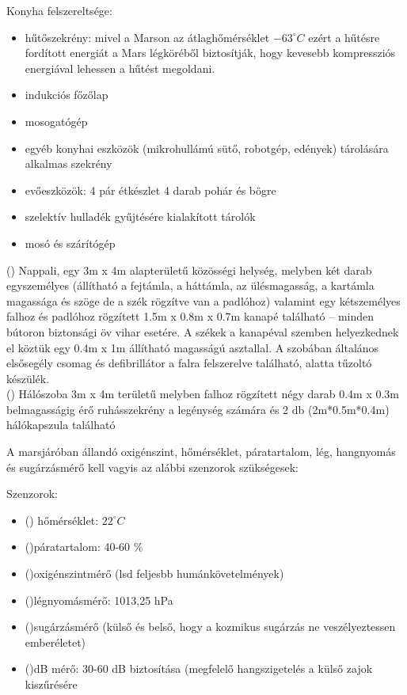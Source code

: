 \documentclass[12pt]{report}
\begin{document}
Konyha felszereltsége:
\begin{itemize}
    \item hűtőszekrény: mivel a Marson az átlaghőmérséklet $ -63^\circ C $ ezért a hűtésre fordított energiát a Mars légköréből biztosítják, hogy kevesebb kompressziós energiával lehessen a hűtést megoldani.
    \item indukciós főzőlap
    \item mosogatógép
    \item egyéb konyhai eszközök (mikrohullámú sütő, robotgép, edények) tárolására alkalmas szekrény
    \item evőeszközök: 4 pár étkészlet 4 darab pohár és bögre
    \item szelektív hulladék gyűjtésére kialakított tárolók
    \item mosó és szárítógép
\end{itemize}

() Nappali, egy 3m x 4m alapterületű közösségi helység, melyben két darab egyszemélyes (állítható a fejtámla, a háttámla, az ülésmagasság, a kartámla magassága és szöge de a szék rögzítve van a padlóhoz) valamint egy kétszemélyes falhoz és padlóhoz rögzített 1.5m x 0.8m x 0.7m kanapé található -- minden bútoron biztonsági öv vihar esetére. A székek a kanapéval szemben helyezkednek el köztük egy 0.4m x 1m állítható magasságú asztallal. A szobában általános elsősegély csomag és defibrillátor a falra felszerelve található, alatta  tűzoltó készülék.\\() Hálószoba 3m x 4m területű melyben falhoz rögzített négy darab 0.4m x 0.3m belmagasságig érő ruhásszekrény a legénység számára és  2 db (2m*0.5m*0.4m) hálókapszula található

A marsjáróban állandó oxigénszint, hőmérséklet, páratartalom, lég, hangnyomás és sugárzásmérő kell vagyis az alábbi szenzorok szükségesek:

Szenzorok:
\begin{itemize}
    \item () hőmérséklet: $22^\circ C $ 
    \item ()páratartalom: 40-60 \%
    \item ()oxigénszintmérő (lsd feljesbb humánkövetelmények)
    \item ()légnyomásmérő: 1013,25 hPa
    \item ()sugárzásmérő (külső és belső, hogy a kozmikus sugárzás ne veszélyeztessen emberéletet)
    \item ()dB mérő: 30-60 dB biztosítása (megfelelő hangszigetelés a külső zajok kiszűrésére
\end{itemize}
\end{document}
